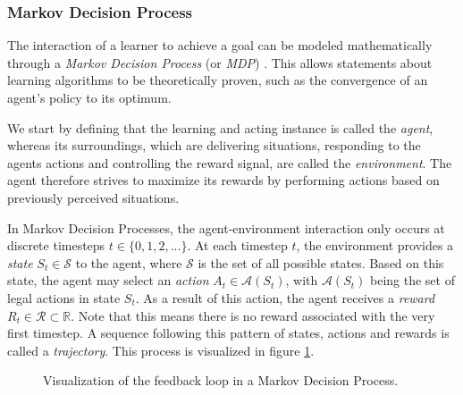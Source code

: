 \subsubsection{Markov Decision Process}
The interaction of a learner to achieve a goal can be modeled mathematically through a \textit{Markov Decision Process} (or \textit{MDP}) \cite{bible}. This allows statements about learning algorithms to be theoretically proven, such as the convergence of an agent's policy to its optimum.

We start by defining that the learning and acting instance is called the \textit{agent}, whereas its surroundings, which are delivering situations, responding to the agents actions and controlling the reward signal, are called the \textit{environment}. The agent therefore strives to maximize its rewards by performing actions based on previously perceived situations. 

In Markov Decision Processes, the agent-environment interaction only occurs at discrete timesteps $t \in \{0, 1, 2, ...\}$. At each timestep $t$, the environment provides a \textit{state} $S_t \in \mathscr{S}$ to the agent, where $\mathscr{S}$ is the set of all possible states. Based on this state, the agent may select an \textit{action} $A_t \in \mathscr{A}(S_t)$, with $\mathscr{A}(S_t)$ being the set of legal actions in state $S_t$. As a result of this action, the agent receives a \textit{reward} $R_t \in \mathscr{R} \subset \mathbb{R}$. Note that this means there is no reward associated with the very first timestep. A sequence following this pattern of states, actions and rewards is called a \textit{trajectory}. This process is visualized in figure \ref{fig:mdp_visualization}.

\begin{figure}[h]
    \centering
    \caption{Visualization of the feedback loop in a Markov Decision Process.}
    \label{fig:mdp_visualization}
\end{figure}

